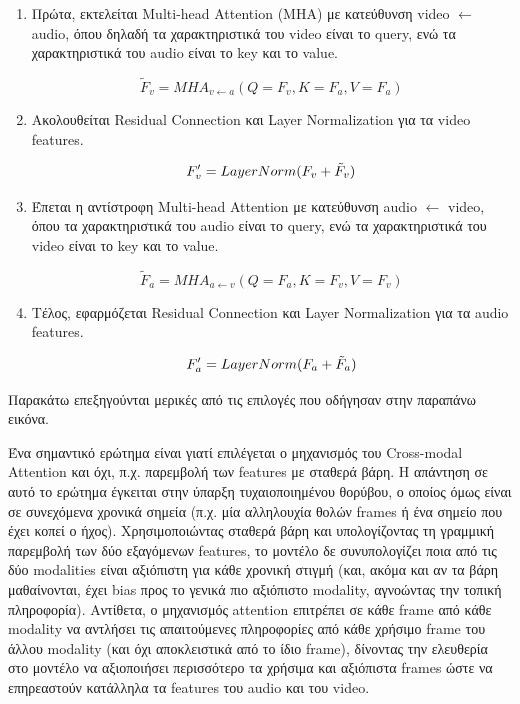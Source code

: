 \begin{enumerate}
\item Πρώτα, εκτελείται Multi-head Attention (MHA) με κατεύθυνση video $\leftarrow$ audio, όπου δηλαδή τα χαρακτηριστικά του video είναι το query, ενώ τα χαρακτηριστικά του audio είναι το key και το value.

\[
\tilde F_v = MHA_{v \leftarrow a}(Q = F_v, K = F_a, V = F_a)
\]

\item Ακολουθείται Residual Connection και Layer Normalization για τα video features.

\[
F_v\sp{\prime} = LayerNorm(F_v + \tilde F_v)
\]

\item Έπεται η αντίστροφη Multi-head Attention με κατεύθυνση audio $\leftarrow$ video, όπου τα χαρακτηριστικά του audio είναι το query, ενώ τα χαρακτηριστικά του video είναι το key και το value.

\[
\tilde F_a = MHA_{a \leftarrow v}(Q = F_a, K = F_v, V = F_v)
\]

\item Τέλος, εφαρμόζεται Residual Connection και Layer Normalization για τα audio features.

\[
F_a\sp{\prime} = LayerNorm(F_a + \tilde F_a)
\]
\end{enumerate}

Παρακάτω επεξηγούνται μερικές από τις επιλογές που οδήγησαν στην παραπάνω εικόνα.

Ένα σημαντικό ερώτημα είναι γιατί επιλέγεται ο μηχανισμός του Cross-modal Attention και όχι, π.χ. παρεμβολή των features με σταθερά βάρη. Η απάντηση σε αυτό το ερώτημα έγκειται στην ύπαρξη τυχαιοποιημένου θορύβου, ο οποίος όμως είναι σε συνεχόμενα χρονικά σημεία (π.χ. μία αλληλουχία θολών frames ή ένα σημείο που έχει κοπεί ο ήχος). Χρησιμοποιώντας σταθερά βάρη και υπολογίζοντας τη γραμμική παρεμβολή των δύο εξαγόμενων features, το μοντέλο δε συνυπολογίζει ποια από τις δύο modalities είναι αξιόπιστη για κάθε χρονική στιγμή (και, ακόμα και αν τα βάρη μαθαίνονται, έχει bias προς το γενικά πιο αξιόπιστο modality, αγνοώντας την τοπική πληροφορία). Αντίθετα, ο μηχανισμός attention επιτρέπει σε κάθε frame από κάθε modality να αντλήσει τις απαιτούμενες πληροφορίες από κάθε χρήσιμο frame του άλλου modality (και όχι αποκλειστικά από το ίδιο frame), δίνοντας την ελευθερία στο μοντέλο να αξιοποιήσει περισσότερο τα χρήσιμα και αξιόπιστα frames ώστε να επηρεαστούν κατάλληλα τα features του audio και του video.


